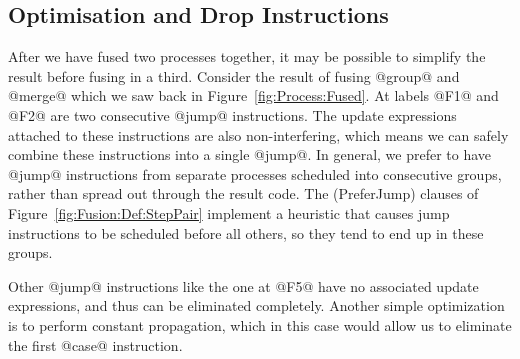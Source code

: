 %
%
%


\subsection{Optimisation and Drop Instructions}
\label{s:Optimisation}
After we have fused two processes together, it may be possible to simplify the result before fusing in a third. Consider the result of fusing @group@ and @merge@ which we saw back in Figure~\ref{fig:Process:Fused}. At labels @F1@ and @F2@ are two consecutive @jump@ instructions. The update expressions attached to these instructions are also non-interfering, which means we can safely combine these instructions into a single @jump@. In general, we prefer to have @jump@ instructions from separate processes scheduled into consecutive groups, rather than spread out through the result code. The (PreferJump) clauses of Figure~\ref{fig:Fusion:Def:StepPair} implement a heuristic that causes jump instructions to be scheduled before all others, so they tend to end up in these groups.

Other @jump@ instructions like the one at @F5@ have no associated update expressions, and thus can be eliminated completely. Another simple optimization is to perform constant propagation, which in this case would allow us to eliminate the first @case@ instruction. 

